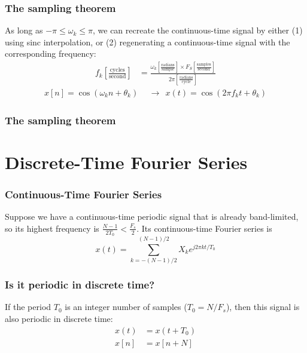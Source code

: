 \documentclass{beamer}
\begin{document}
\begin{frame}
  \frametitle{The sampling theorem}

  As long as $-\pi\le\omega_k\le \pi$, we can recreate the
  continuous-time signal by either (1) using sinc interpolation, or
  (2) regenerating a continuous-time signal with the corresponding
  frequency:
  \begin{align*}
    f_k \left[\frac{\textrm{cycles}}{\textrm{second}}\right] &=
    \frac{\omega_k \left[\frac{\textrm{radians}}{\textrm{sample}}\right]\times F_S \left[\frac{\textrm{samples}}{\textrm{second}}\right]}{2\pi\left[\frac{\textrm{radians}}{\textrm{cycle}}\right]}
  \end{align*}
  \begin{align*}
    x[n] = \cos(\omega_k n+\theta_k)~~&\rightarrow~~
    x(t) = \cos(2\pi f_k t+\theta_k)
  \end{align*}
\end{frame}

\begin{frame}
  \frametitle{The sampling theorem}

\end{frame}

\section[DTFS]{Discrete-Time Fourier Series}
\setcounter{subsection}{1}

\begin{frame}
  \frametitle{Continuous-Time Fourier Series}

  Suppose we have a continuous-time periodic signal that is already
  band-limited, so its highest frequency is
  $\frac{N-1}{2T_0}<\frac{F_s}{2}$.  Its continuous-time Fourier
  series is
  \[
  x(t) = \sum_{k=-(N-1)/2}^{(N-1)/2} X_k e^{j2\pi kt/T_0}
  \]
\end{frame}
\begin{frame}
  \frametitle{Is it periodic in discrete time?}

  If the period $T_0$ is an integer number of samples ($T_0=N/F_s$),
  then this signal is also periodic in discrete time:
  \begin{align*}
    x(t) &= x(t+T_0)\\
    x[n] &= x[n+N]
  \end{align*}
\end{frame}
\end{document}
